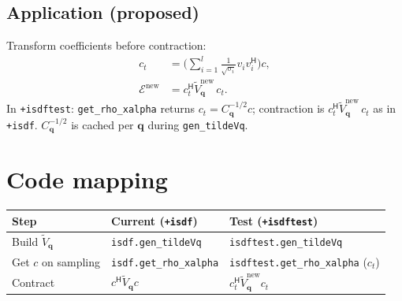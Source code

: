 \documentclass[11pt]{article}
\newcommand{\qq}{\mathbf{q}}
\newcommand{\herm}{^{\mathsf{H}}}
\begin{document}
\subsection{Application (proposed)}
Transform coefficients before contraction:
\begin{align}
  c_t &=  \bigl(\sum_{i=1}^l \frac{1}{\sqrt{\sigma_i}} v_i v_i\herm \bigr) c,\\
  \mathcal{E}^{\mathrm{new}} &= c_t^{\mathsf{H}} \tilde{V}_{\qq}^{\mathrm{new}}\, c_t.
\end{align}
In \texttt{+isdftest}: \texttt{get\_rho\_xalpha} returns $c_t = C_{\qq}^{-1/2} c$;
contraction is $c_t^{\mathsf{H}} \tilde{V}_{\qq}^{\mathrm{new}}\, c_t$ as in \texttt{+isdf}.
$C_{\qq}^{-1/2}$ is cached per $\qq$ during \texttt{gen\_tildeVq}.

\section{Code mapping}
\begin{center}
\begin{tabular}{lll}
\hline
Step & Current (\texttt{+isdf}) & Test (\texttt{+isdftest}) \\
\hline
Build $\tilde{V}_{\qq}$ & \texttt{isdf.gen\_tildeVq} & \texttt{isdftest.gen\_tildeVq} \\
Get $c$ on sampling & \texttt{isdf.get\_rho\_xalpha} & \texttt{isdftest.get\_rho\_xalpha} ($c_t$) \\
Contract & $c^{\mathsf{H}} \tilde{V}_{\qq} c$ & $c_t^{\mathsf{H}} \tilde{V}_{\qq}^{\mathrm{new}} c_t$ \\
\hline
\end{tabular}
\end{center}
\end{document}
